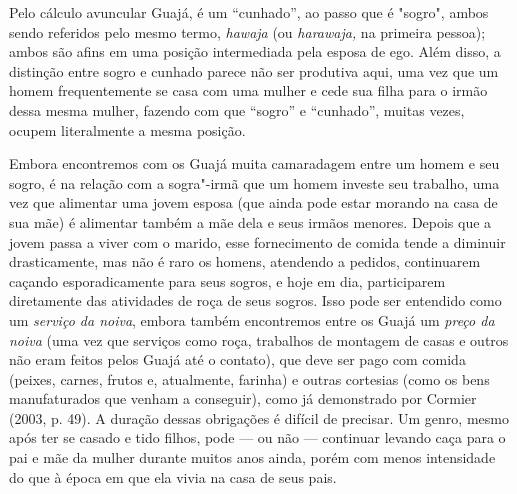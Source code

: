 Pelo cálculo avuncular Guajá,  é um ``cunhado'', ao passo que  é
"sogro", ambos sendo referidos pelo mesmo termo, \emph{hawaja} (ou
\emph{harawaja,} na primeira pessoa); ambos são afins em uma posição
intermediada pela esposa de ego. Além disso, a distinção entre sogro e
cunhado parece não ser produtiva aqui, uma vez que um homem
frequentemente se casa com uma mulher e cede sua filha para o irmão
dessa mesma mulher, fazendo com que ``sogro'' e ``cunhado'', muitas vezes,
ocupem literalmente a mesma posição.

Embora encontremos com os Guajá muita camaradagem entre um homem e seu
sogro, é na relação com a sogra"-irmã que um homem investe seu trabalho,
uma vez que alimentar uma jovem esposa (que ainda pode estar morando na
casa de sua mãe) é alimentar também a mãe dela e seus irmãos menores.
Depois que a jovem passa a viver com o marido, esse fornecimento de
comida tende a diminuir drasticamente, mas não é raro os homens,
atendendo a pedidos, continuarem caçando esporadicamente para seus
sogros, e hoje em dia, participarem diretamente das atividades de roça
de seus sogros. Isso pode ser entendido como um \emph{serviço da noiva},
embora também encontremos entre os Guajá um \emph{preço da noiva} (uma
vez que serviços como roça, trabalhos de montagem de casas e outros não
eram feitos pelos Guajá até o contato), que deve ser pago com comida
(peixes, carnes, frutos e, atualmente, farinha) e outras cortesias (como
os bens manufaturados que venham a conseguir), como já demonstrado por
Cormier (2003, p. 49). A duração dessas obrigações é difícil de precisar.
Um genro, mesmo após ter se casado e tido filhos, pode --- ou não ---
continuar levando caça para o pai e mãe da mulher durante muitos anos
ainda, porém com menos intensidade do que à época em que ela vivia na
casa de seus pais.

